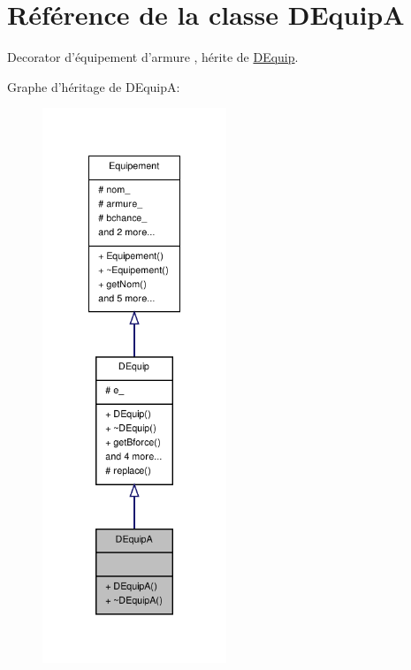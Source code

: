\hypertarget{class_d_equip_a}{\section{Référence de la classe D\-Equip\-A}
\label{class_d_equip_a}
}


Decorator d'équipement d'armure , hérite de \hyperlink{class_d_equip}{D\-Equip}.  




Graphe d'héritage de D\-Equip\-A\-:
\nopagebreak
\begin{figure}[H]
\begin{center}
\leavevmode
\includegraphics[width=156pt]{class_d_equip_a__inherit__graph}
\end{center}
\end{figure}


